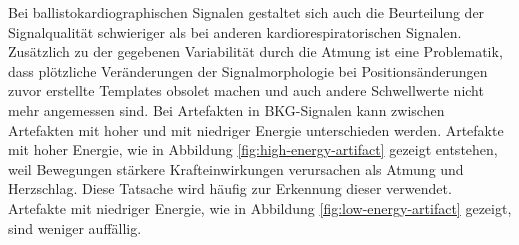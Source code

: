 	Bei ballistokardiographischen Signalen gestaltet sich auch die Beurteilung der Signalqualität schwieriger als bei anderen kardiorespiratorischen Signalen. Zusätzlich zu der gegebenen Variabilität durch die Atmung ist eine Problematik, dass plötzliche Veränderungen der Signalmorphologie bei Positionsänderungen zuvor erstellte Templates obsolet machen und auch andere Schwellwerte nicht mehr angemessen sind. Bei Artefakten in \ac{BKG}-Signalen kann zwischen Artefakten mit hoher und mit niedriger Energie unterschieden werden. Artefakte mit hoher Energie, wie in Abbildung \ref{fig:high-energy-artifact} gezeigt entstehen, weil Bewegungen stärkere Krafteinwirkungen verursachen als Atmung und Herzschlag. Diese Tatsache wird häufig zur Erkennung dieser verwendet. Artefakte mit niedriger Energie, wie in Abbildung \ref{fig:low-energy-artifact} gezeigt, sind weniger auffällig.
	

